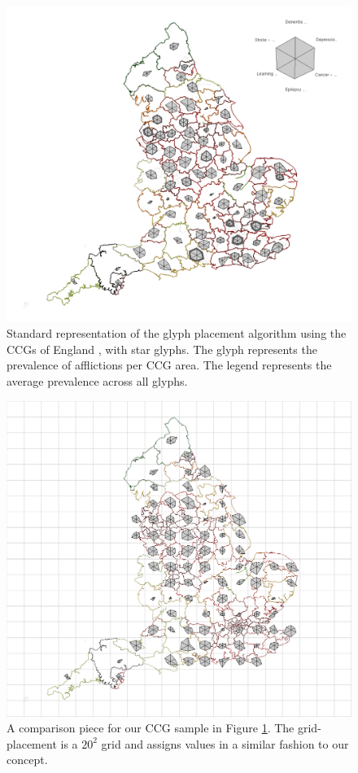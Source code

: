 
%
\begin{figure} \centering
\includegraphics[width=1\textwidth]{images/ch5/CCGgridAFull.png}
\caption{Standard representation of the glyph placement algorithm using the CCGs of England \cite{publicHealthEngland}, with star glyphs. The glyph represents the prevalence of afflictions per CCG area. The legend represents the average prevalence across all glyphs. } \label{fig:sample1}
\end{figure}
\begin{figure} \centering
\includegraphics[width=1\textwidth]{images/ch5/CCGgridBFull.png}
\caption{A comparison piece for our CCG sample in Figure \ref{fig:sample1}. The grid-placement is a $20^2$ grid and assigns values in a similar fashion to our concept.}
\end{figure}
